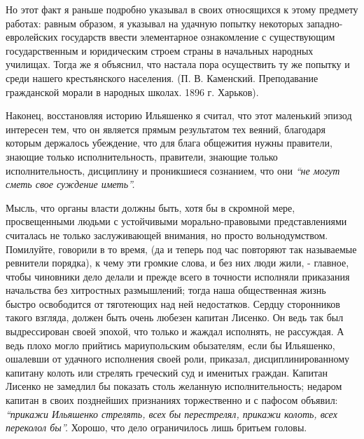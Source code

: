 \documentclass[a4paper,20pt]{report}
\begin{document}
Но этот факт я раньше подробно указывал в своих относящихся к этому предмету работах:
равным образом, я указывал на удачную попытку некоторых
западно-евролейских государств ввести элементарное ознакомление с существующим
государственным и юридическим
строем страны в начальных народных училищах. Тогда
же я объяснил, что настала пора осуществить ту же попытку и среди нашего крестьянского населения.
(П. В. Каменский. Преподавание гражданской морали в народных
школах. 1896 г. Харьков).

Наконец, восстановляя историю Ильяшенко я считал,
что этот маленький эпизод интересен тем, что он является прямым результатом 
тех веяний, благодаря которым держалось убеждение, 
что для блага общежития нужны правители, знающие только исполнительность,
правители, знающие только исполнительность, дисциплину и
проникшиеся сознанием, что они \emph{``не могут сметь свое суждение иметь''.}

Мысль, что органы власти должны быть, хотя бы в
скромной мере, просвещенными людьми с устойчивыми морально-правовыми
представлениями считалась не только заслуживающей внимания, 
но просто вольнодумством. Помилуйте, говорили в то время, 
(да и теперь под час повторяют
так называемые ревнители порядка), к чему эти громкие слова,
и без них люди жили, - главное, чтобы чиновники
дело делали и прежде всего в точности исполняли приказания 
начальства без хитростных размышлений; тогда наша
общественная жизнь быстро освободится от тяготеющих над ней недостатков.
Сердцу сторонников такого взгляда, должен быть очень любезен капитан Лисенко.
Он ведь так был выдрессирован своей эпохой, что только и жаждал исполнять, не
рассуждая. А ведь плохо могло прийтись мариупольским обызателям, если бы
Ильяшенко, ошалевши от удачного исполнения своей роли, приказал,
дисциплинированному капитану колоть или стрелять греческий суд и именитых
граждан.  Капитан Лисенко не замедлил бы показать столь желанную
исполнительность; недаром капитан в своих позднейших признаниях торжественно и
с пафосом объявил: \emph{``прикажи Ильяшенко стрелять, всех бы перестрелял,
прикажи колоть, всех переколол бы''.} Хорошо, что дело ограничилось лишь
бритьем головы.

\end{document}
